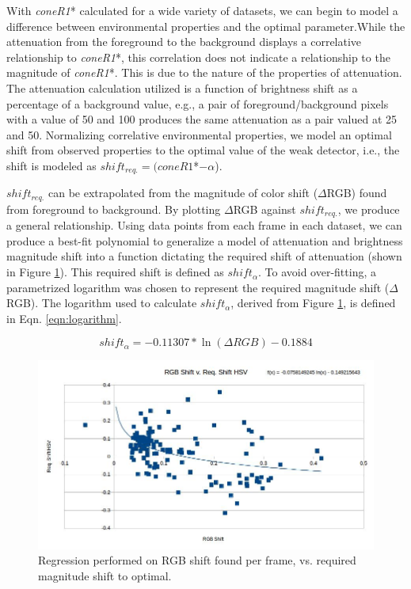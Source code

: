 With \textit{coneR1}* calculated for a wide variety of datasets, we can begin to model a difference between environmental properties and the optimal parameter.While the attenuation from the foreground to the background displays a correlative relationship to \textit{coneR1}*, this correlation does not indicate a relationship to the magnitude of \textit{coneR1}*. This is due to the nature of the properties of attenuation. The attenuation calculation utilized is a function of brightness shift as a percentage of a background value, e.g., a pair of foreground/background pixels with a value of 50 and 100 produces the same attenuation as a pair valued at 25 and 50. Normalizing correlative environmental properties, we model an optimal shift from observed properties to the optimal value of the weak detector, i.e., the shift is modeled as $shift_{req.} = (coneR1$*$ - \alpha$).

$shift_{req.}$ can be extrapolated from the magnitude of color shift ($\Delta$RGB) found from foreground to background. By plotting $\Delta$RGB against $shift_{req.}$, we produce a general relationship. Using data points from each frame in each dataset, we can produce a best-fit polynomial to generalize a model of attenuation and brightness magnitude shift into a function dictating the required shift of attenuation (shown in Figure \ref{fig:polyfit}). This required shift is defined as $shift_{\alpha}$. To avoid over-fitting, a parametrized logarithm was chosen to represent the required magnitude shift ($\Delta$RGB). The logarithm used to calculate $shift_{\alpha}$, derived from Figure \ref{fig:polyfit}, is defined in Eqn. \ref{eqn:logarithm}.

\begin{equation}
shift_{\alpha} = -0.11307*\ln(\Delta RGB) - 0.1884 
\label{eqn:logarithm}
\end{equation}

\begin{figure}
  \centering
  \includegraphics[width=1\linewidth]{figures/polyfit.jpg}
  \caption{Regression performed on RGB shift found per frame, vs. required magnitude shift to optimal.}
  \label{fig:polyfit}
\end{figure}

